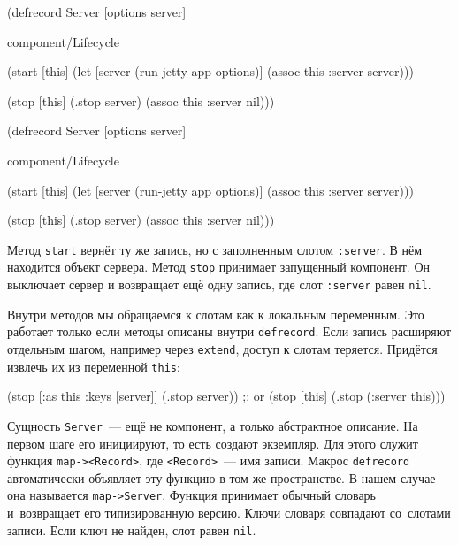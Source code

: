 \ifnarrow

\begin{english}
  \begin{clojure}
(defrecord Server [options server]

  component/Lifecycle

  (start [this]
    (let [server (run-jetty app
                   options)]
      (assoc this :server server)))

  (stop [this]
    (.stop server)
    (assoc this :server nil)))
  \end{clojure}
\end{english}

\else

\begin{english}
  \begin{clojure}
(defrecord Server [options server]

  component/Lifecycle

  (start [this]
    (let [server (run-jetty app options)]
      (assoc this :server server)))

  (stop [this]
    (.stop server)
    (assoc this :server nil)))
  \end{clojure}
\end{english}
\fi


Метод \verb|start| вернёт ту же запись, но с заполненным слотом
\verb|:server|. В нём находится объект сервера. Метод \verb|stop| принимает
запущенный компонент. Он выключает сервер и возвращает ещё одну запись, где слот
\verb|:server| равен \verb|nil|.


Внутри методов мы обращаемся к слотам как к локальным переменным. Это работает
только если методы описаны внутри \verb|defrecord|. Если запись расширяют
отдельным шагом, например через \verb|extend|, доступ к слотам
теряется. Придётся извлечь их из переменной \verb|this|:

\begin{english}
  \begin{clojure}
(stop [{:as this :keys [server]}]
  (.stop server))
;; or
(stop [this]
  (.stop (:server this)))
  \end{clojure}
\end{english}

Сущность \verb|Server|~--- ещё не компонент, а только абстрактное описание. На
первом шаге его инициируют, то есть создают экземпляр. Для этого служит функция
\verb|map-><Record>|, где \verb|<Record>|~--- имя записи. Макрос
\verb|defrecord| автоматически объявляет эту функцию в том же пространстве. В
нашем случае она называется \verb|map->Server|. Функция принимает обычный
словарь и~возвращает его типизированную версию. Ключи словаря совпадают
со~слотами записи. Если ключ не найден, слот равен \verb|nil|.

